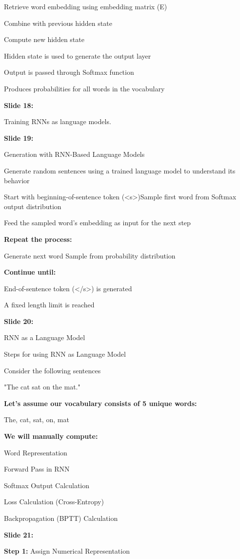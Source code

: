 \documentclass[11pt,a4paper]{article}
\begin{document}
Retrieve word embedding using embedding matrix (E)

Combine with previous hidden state

Compute new hidden state

Hidden state is used to generate the output layer

Output is passed through Softmax function

Produces probabilities for all words in the vocabulary

\textbf{Slide 18:}

Training RNNs as language models.

\textbf{Slide 19:}

Generation with RNN-Based Language Models

Generate random sentences using a trained language model to understand its behavior

Start with beginning-of-sentence token (<s>)Sample first word from Softmax output distribution

Feed the sampled word’s embedding as input for the next step

\textbf{Repeat the process:} 

Generate next word Sample from probability distribution

\textbf{Continue until:} 

End-of-sentence token (</s>) is generated

A fixed length limit is reached

\textbf{Slide 20:}

RNN as a Language Model

Steps for using RNN as Language Model

Consider the following sentences

"The cat sat on the mat."

\textbf{Let’s assume our vocabulary consists of 5 unique words:} 

The, cat, sat, on, mat

\textbf{We will manually compute:} 

Word Representation

Forward Pass in RNN

Softmax Output Calculation

Loss Calculation (Cross-Entropy)

Backpropagation (BPTT) Calculation

\textbf{Slide 21:}

\textbf{Step 1:}  Assign Numerical Representation
\end{document}
